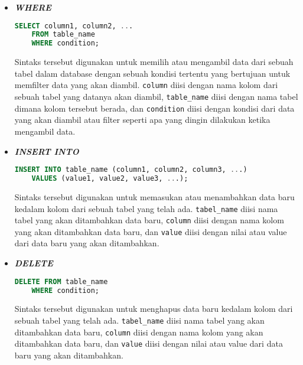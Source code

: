 \begin{itemize}
    \item \textbf{\textit{WHERE}}
    \begin{lstlisting}[language=SQL]
    SELECT column1, column2, ...
    FROM table_name
    WHERE condition;
    \end{lstlisting}
    Sintaks tersebut digunakan untuk memilih atau mengambil data dari sebuah tabel dalam database dengan sebuah kondisi tertentu yang bertujuan untuk memfilter data yang akan diambil. \texttt{column} diisi dengan nama kolom dari sebuah tabel yang datanya akan diambil, \texttt{table\_name} diisi dengan nama tabel dimana kolom tersebut berada, dan \texttt{condition} diisi dengan kondisi dari data yang akan diambil atau filter seperti apa yang dingin dilakukan ketika mengambil data.

    \item \textbf{\textit{INSERT INTO}}
    \begin{lstlisting}[language=SQL]
    INSERT INTO table_name (column1, column2, column3, ...)
    VALUES (value1, value2, value3, ...);
    \end{lstlisting}
    Sintaks tersebut digunakan untuk memasukan atau menambahkan data baru kedalam kolom dari sebuah tabel yang telah ada. \texttt{tabel\_name} diisi nama tabel yang akan ditambahkan data baru, \texttt{column} diisi dengan nama kolom yang akan ditambahkan data baru, dan \texttt{value} diisi dengan nilai atau value dari data baru yang akan ditambahkan.

    \item \textbf{\textit{DELETE}}
    \begin{lstlisting}[language=SQL]
    DELETE FROM table_name
    WHERE condition;
    \end{lstlisting}
     Sintaks tersebut digunakan untuk menghapus data baru kedalam kolom dari sebuah tabel yang telah ada. \texttt{tabel\_name} diisi nama tabel yang akan ditambahkan data baru, \texttt{column} diisi dengan nama kolom yang akan ditambahkan data baru, dan \texttt{value} diisi dengan nilai atau value dari data baru yang akan ditambahkan.
\end{itemize}

